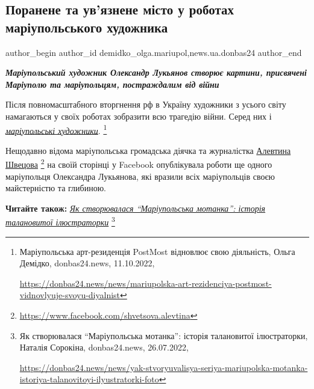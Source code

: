  
 
 
 
 
 
\subsection{Поранене та ув'язнене місто у роботах маріупольського художника}
\label{sec:24_10_2022.stz.news.ua.donbas24.1.kartyny_oleksandr_lukjanov}
 
\ifcmt
 author_begin
   author_id demidko_olga.mariupol,news.ua.donbas24
 author_end
\fi


\begin{center}
\em\bfseries\color{blue}\Large
Маріупольський художник Олександр Лукьянов створює картини, присвячені
Маріуполю та маріупольцям, постраждалим від війни
\end{center}

Після повномасштабного вторгнення рф в Україну художники з усього світу
намагаються у своїх роботах зобразити всю трагедію війни. Серед них і
\href{https://donbas24.news/news/mariupolska-art-rezidenciya-postmost-vidnovlyuje-svoyu-diyalnist}{\emph{маріупольські художники}}.%
\footnote{Маріупольська арт-резиденція PostMost відновлює свою діяльність, Ольга Демідко, donbas24.news, 11.10.2022, \par\url{https://donbas24.news/news/mariupolska-art-rezidenciya-postmost-vidnovlyuje-svoyu-diyalnist}}

Нещодавно відома маріупольська громадська діячка та журналістка \href{https://www.facebook.com/shvetsova.alevtina}{Алевтина
Швецова}%
\footnote{\url{https://www.facebook.com/shvetsova.alevtina}}
 на своїй сторінці у Facebook опублікувала роботи ще одного маріупольця
Олександра Лукьянова, які вразили всіх маріупольців своєю майстерністю та
глибиною.

\textbf{Читайте також:} \href{https://donbas24.news/news/yak-stvoryuvalisya-seriya-mariupolska-motanka-istoriya-talanovitoyi-ilyustratorki-foto}{\emph{Як створювалася \enquote{Маріупольська мотанка}: історія талановитої ілюстраторки}}%
\footnote{Як створювалася \enquote{Маріупольська мотанка}: історія талановитої ілюстраторки, Наталія Сорокіна, donbas24.news, 26.07.2022, \par%
\url{https://donbas24.news/news/yak-stvoryuvalisya-seriya-mariupolska-motanka-istoriya-talanovitoyi-ilyustratorki-foto}%
}

